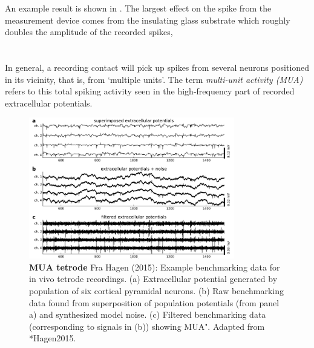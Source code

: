 An example result is shown in . The largest effect on the spike from the measurement device comes from the insulating glass substrate which roughly doubles the amplitude of the recorded spikes, 

\section{}
In general, a recording contact will pick up spikes from several neurons positioned in its vicinity, that is, from `multiple units'.
The term \emph{multi-unit activity (MUA)} refers to this total spiking activity seen in the high-frequency part of recorded extracellular potentials. 

\begin{figure}[!ht]
\begin{center}
\includegraphics[width=0.8\textwidth]{Figures/Spikes/MUA-11}
\end{center}
\caption[]{\textbf{MUA tetrode}
Fra Hagen (2015):
Example benchmarking data for in vivo tetrode recordings. (a) Extracellular potential generated by population of six cortical pyramidal neurons.  (b) Raw benchmarking data found from superposition of population potentials (from panel a) and synthesized model noise. (c) Filtered benchmarking data (corresponding to signals in (b)) showing MUA". 
Adapted from \citeasnoun**{Hagen2015}.
}
\label{fig:Spikes:MUA-tetrode}
\end{figure}


